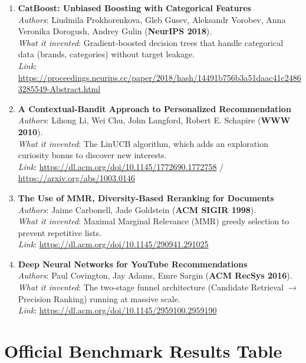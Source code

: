 \documentclass[11pt,a4paper]{article}
\begin{document}
\begin{enumerate}
    \item \textbf{CatBoost: Unbiased Boosting with Categorical Features}\\
    \textit{Authors}: Liudmila Prokhorenkova, Gleb Gusev, Aleksandr Vorobev, Anna Veronika Dorogush, Andrey Gulin (\textbf{NeurIPS 2018}).\\
    \textit{What it invented}: Gradient-boosted decision trees that handle categorical data (brands, categories) without target leakage.\\
    \textit{Link}: \url{https://proceedings.neurips.cc/paper/2018/hash/14491b756b3a51daac41c24863285549-Abstract.html}

    \item \textbf{A Contextual-Bandit Approach to Personalized Recommendation}\\
    \textit{Authors}: Lihong Li, Wei Chu, John Langford, Robert E. Schapire (\textbf{WWW 2010}).\\
    \textit{What it invented}: The LinUCB algorithm, which adds an exploration curiosity bonus to discover new interests.\\
    \textit{Link}: \url{https://dl.acm.org/doi/10.1145/1772690.1772758} / \url{https://arxiv.org/abs/1003.0146}

    \item \textbf{The Use of MMR, Diversity-Based Reranking for Documents}\\
    \textit{Authors}: Jaime Carbonell, Jade Goldstein (\textbf{ACM SIGIR 1998}).\\
    \textit{What it invented}: Maximal Marginal Relevance (MMR) greedy selection to prevent repetitive lists.\\
    \textit{Link}: \url{https://dl.acm.org/doi/10.1145/290941.291025}

    \item \textbf{Deep Neural Networks for YouTube Recommendations}\\
    \textit{Authors}: Paul Covington, Jay Adams, Emre Sargin (\textbf{ACM RecSys 2016}).\\
    \textit{What it invented}: The two-stage funnel architecture (Candidate Retrieval $\to$ Precision Ranking) running at massive scale.\\
    \textit{Link}: \url{https://dl.acm.org/doi/10.1145/2959100.2959190}
\end{enumerate}

\section{Official Benchmark Results Table}
\end{document}

